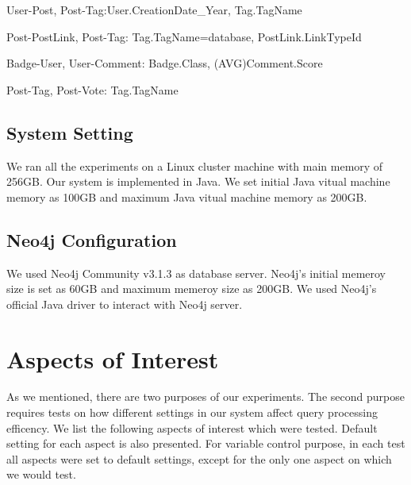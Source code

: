 User-Post, Post-Tag:User.CreationDate_Year, Tag.TagName

Post-PostLink, Post-Tag: Tag.TagName=database, PostLink.LinkTypeId

Badge-User, User-Comment: Badge.Class, (AVG)Comment.Score

Post-Tag, Post-Vote: Tag.TagName




\subsection{System Setting}

We ran all the experiments on a Linux cluster machine with main memory of 256GB. Our system is implemented in Java. We set initial Java vitual machine memory as 100GB and maximum Java vitual machine memory as 200GB.

\subsection{Neo4j Configuration}
We used Neo4j Community v3.1.3 as database server. Neo4j's initial memeroy size is set as 60GB and maximum memeroy size as 200GB. We used Neo4j's official Java driver to interact with Neo4j server.

\section{Aspects of Interest}
\label{Aspects of Interest}

As we mentioned, there are two purposes of our experiments. The second purpose requires tests on how different settings in our system affect query processing efficency. We list the following aspects of interest which were tested. Default setting for each aspect is also presented. For variable control purpose, in each test all aspects were set to default settings, except for the only one aspect on which we would test.  

